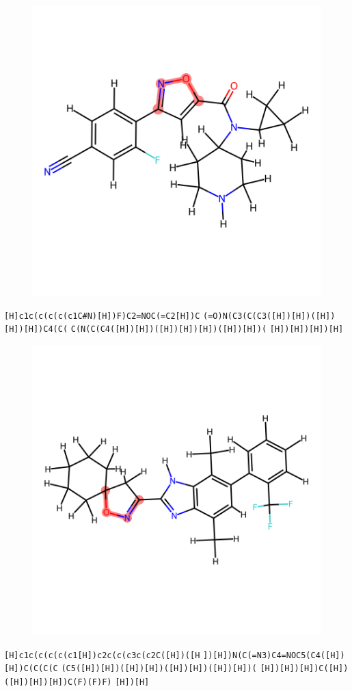 \documentclass{article}
\begin{document}
\begin{figure}[ht]
\centering
    \includegraphics{mol90.png}
\end{figure}
\verb|[H]c1c(c(c(c(c1C#N)[H])F)C2=NOC(=C2[H])C| \verb|(=O)N(C3(C(C3([H])[H])([H])[H])[H])C4(C(| \verb|C(N(C(C4([H])[H])([H])[H])[H])([H])[H])(| \verb|[H])[H])[H])[H]|

\begin{figure}[ht]
\centering
    \includegraphics{mol91.png}
\end{figure}
\verb|[H]c1c(c(c(c(c1[H])c2c(c(c3c(c2C([H])([H| \verb|])[H])N(C(=N3)C4=NOC5(C4([H])[H])C(C(C(C| \verb|(C5([H])[H])([H])[H])([H])[H])([H])[H])(| \verb|[H])[H])[H])C([H])([H])[H])[H])C(F)(F)F)| \verb|[H])[H]|
\end{document}

